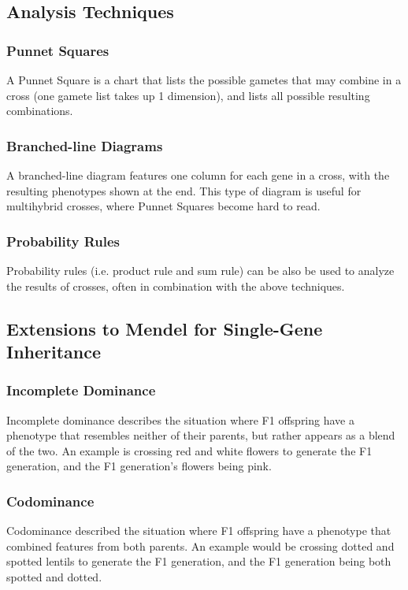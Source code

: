 \documentclass[12pt,titlepage]{article}
\begin{document}
      \subsection{Analysis Techniques}
        \subsubsection{Punnet Squares}
          A Punnet Square is a chart that lists the possible gametes that may combine in a cross (one gamete list takes up 1 dimension), and lists all
          possible resulting combinations.

        \subsubsection{Branched-line Diagrams}
          A branched-line diagram features one column for each gene in a cross, with the resulting phenotypes shown at the end. This type of diagram
          is useful for multihybrid crosses, where Punnet Squares become hard to read.

        \subsubsection{Probability Rules}
          Probability rules (i.e. product rule and sum rule) can be also be used to analyze the results of crosses, often in combination with the above
          techniques.

      \subsection{Extensions to Mendel for Single-Gene Inheritance}
        \subsubsection{Incomplete Dominance}
          Incomplete dominance describes the situation where F1 offspring have a phenotype that resembles neither of their parents, but rather appears as a blend
          of the two. An example is crossing red and white flowers to generate the F1 generation, and the F1 generation's flowers being pink.

        \subsubsection{Codominance}
          Codominance described the situation where F1 offspring have a phenotype that combined features from both parents. An example would be crossing dotted and
          spotted lentils to generate the F1 generation, and the F1 generation being both spotted and dotted.
\end{document}
